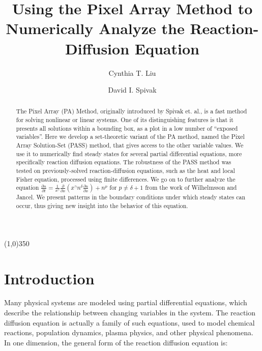 \documentclass[11pt]{article}
\begin{document}
\title{Using the Pixel Array Method to\\Numerically Analyze the Reaction-Diffusion Equation}
\author[1]{Cynthia T. Liu}
\author[2]{David I. Spivak}
\date{}

\maketitle

\begin{abstract}
The Pixel Array (PA) Method, originally introduced by Spivak et. al., is a fast method for solving nonlinear or linear systems. One of its distinguishing features is that it presents all solutions within a bounding box, as a plot in a low number of ``exposed variables''. Here we develop a set-theoretic variant of the PA method, named the Pixel Array Solution-Set (PASS) method, that gives access to the other variable values. We use it to numerically find steady states for several partial differential equations, more specifically reaction diffusion equations. The robustness of the PASS method was tested on previously-solved reaction-diffusion equations, such as the heat and local Fisher equation, processed using finite differences. We go on to further analyze the equation
$\frac{\partial{n}}{\partial{t}} = \frac{1}{x^\gamma} \frac{\partial}{\partial{x}}\left(x^\gamma n^\delta \frac{\partial{n}}{\partial{x}} \right) + n^p$
for $p \ne \delta + 1$ from the work of Wilhelmsson and Jancel. We present patterns in the boundary conditions under which steady states can occur, thus giving new insight into the behavior of this equation.
\end{abstract}

\begin{center}
\line(1,0){350}
\end{center}

\section{Introduction}

Many physical systems are modeled using partial differential equations, which describe the relationship between changing variables in the system. The reaction diffusion equation is actually a family of such equations, used to model chemical reactions, population dynamics, plasma physics, and other physical phenomena. In one dimension, the general form of the reaction diffusion equation is:
\end{document}

